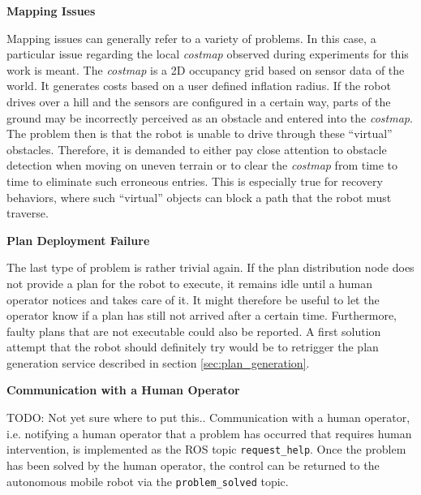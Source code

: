 \documentclass[english, master, utf8]{base/thesis_KBS}
\newcommand{\code}[1]{\colorbox{light-gray}{\texttt{#1}}}
\begin{document}
\noindent
\textbf{Mapping Issues}\newline

\noindent
Mapping issues can generally refer to a variety of problems. In this case, a particular issue regarding the local \textit{costmap} observed during experiments for this work is meant.
The \textit{costmap} is a 2D occupancy grid based on sensor data of the world. It generates costs based on a user defined inflation radius.
If the robot drives over a hill and the sensors are configured in a certain way, parts of the ground may be incorrectly perceived as an obstacle and entered into the \textit{costmap}.
The problem then is that the robot is unable to drive through these ``virtual'' obstacles. Therefore, it is demanded to either pay close attention to obstacle detection
when moving on uneven terrain or to clear the \textit{costmap} from time to time to eliminate such erroneous entries. This is especially true for recovery behaviors, 
where such ``virtual'' objects can block a path that the robot must traverse.\newline

\noindent
\textbf{Plan Deployment Failure}\newline

\noindent
The last type of problem is rather trivial again. If the plan distribution node does not provide a plan for the robot to execute, it remains idle until a human operator 
notices and takes care of it. It might therefore be useful to let the operator know if a plan has still not arrived after a certain time.
Furthermore, faulty plans that are not executable could also be reported. A first solution attempt that the robot should definitely try would be to retrigger 
the plan generation service described in section \ref{sec:plan_generation}.\newline

\noindent
\textbf{Communication with a Human Operator}\newline

\noindent
TODO: Not yet sure where to put this..\newline
Communication with a human operator, i.e. notifying a human operator that a problem has occurred that requires human intervention,
is implemented as the ROS topic \code{\/request\_help}. Once the problem has been solved by the human operator, the control can be returned
to the autonomous mobile robot via the \code{\/problem\_solved} topic.\newline
\end{document}
